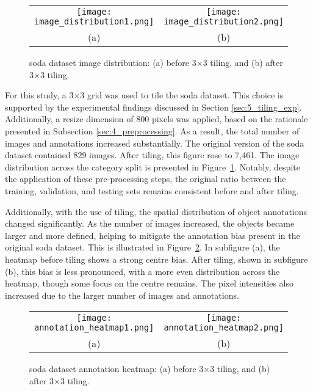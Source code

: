 \begin{figure}[ht]
  \centering
  \begin{tabular}{cc}
    \texttt{[image: image\_distribution1.png]} &
    \texttt{[image: image\_distribution2.png]} \\
    \small (a) & \small (b) \\
  \end{tabular}
  \caption{\gls{soda} dataset image distribution: (a) before 3$\times$3 tiling, and (b) after 3$\times$3 tiling.}
  \label{fig:soda_image_distribution}
\end{figure}
For this study, a 3$\times$3 grid was used to tile the \gls{soda} dataset. This choice is supported by the experimental findings discussed in Section \ref{sec:5_tiling_exp}. Additionally, a resize dimension of 800 pixels was applied, based on the rationale presented in Subsection \ref{sec:4_preprocessing}. As a result, the total number of images and annotations increased substantially. The original version of the \gls{soda} dataset contained 829 images. After tiling, this figure rose to 7,461. The image distribution across the category split is presented in Figure~\ref{fig:soda_image_distribution}. Notably, despite the application of these pre-processing steps, the original ratio between the training, validation, and testing sets remains consistent before and after tiling.


Additionally, with the use of tiling, the spatial distribution of object annotations changed significantly. As the number of images increased, the objects became larger and more defined, helping to mitigate the annotation bias present in the original \gls{soda} dataset. This is illustrated in Figure~\ref{fig:soda_annotation_heatmap}. In subfigure (a), the heatmap before tiling shows a strong centre bias. After tiling, shown in subfigure (b), this bias is less pronounced, with a more even distribution across the heatmap, though some focus on the centre remains. The pixel intensities also increased due to the larger number of images and annotations.

\begin{figure}[ht]
  \centering
  \begin{tabular}{cc}
    \texttt{[image: annotation\_heatmap1.png]} &
    \texttt{[image: annotation\_heatmap2.png]} \\
    \small (a) & \small (b) \\
  \end{tabular}
  \caption{\gls{soda} dataset annotation heatmap: (a) before 3$\times$3 tiling, and (b) after 3$\times$3 tiling.}
  \label{fig:soda_annotation_heatmap}
\end{figure}

